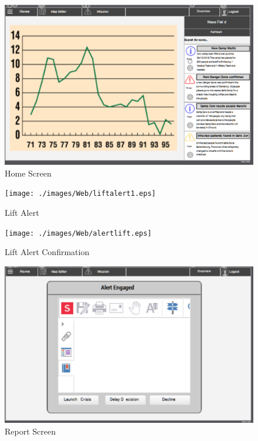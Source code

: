 \begin{figure}[htbp]
\begin{center}
 \caption{\label{fig:W2} Home Screen}
   \includegraphics[width=150mm]{./images/Web/chomescreen.eps}
\end{center}
\end{figure}
\begin{figure}[htbp]
\begin{center}
 \caption{\label{fig:We16} Lift Alert}
   \texttt{[image: ./images/Web/liftalert1.eps]}
\end{center}
\end{figure}
\begin{figure}[htbp]
\begin{center}
 \caption{\label{fig:We17} Lift Alert Confirmation}
   \texttt{[image: ./images/Web/alertlift.eps]}
\end{center}
\end{figure}
\begin{figure}[htbp]
\begin{center}
 \caption{\label{fig:W4} Report Screen}
   \includegraphics[width=150mm]{./images/Web/calertengaged.eps}
\end{center}
\end{figure}

